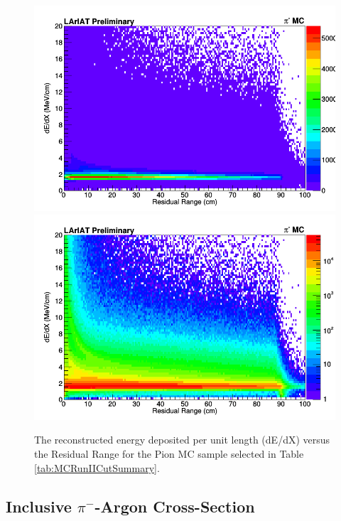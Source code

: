 \begin{figure}[h!]
\centering
\includegraphics[scale=0.33]{./images/dEdXvsRRPionMC.png}
\includegraphics[scale=0.33]{./images/dEdXvsRRPionMCLog.png}
\caption{The reconstructed energy deposited per unit length (dE/dX) versus the Residual  Range for the Pion MC sample selected in Table \ref{tab:MCRunIICutSummary}.}
\label{fig:PionMCdEdXvsRR}
\end{figure}


\newpage
\subsection{Inclusive $\pi^{-}$-Argon Cross-Section} \label{sec:CrossSection}
